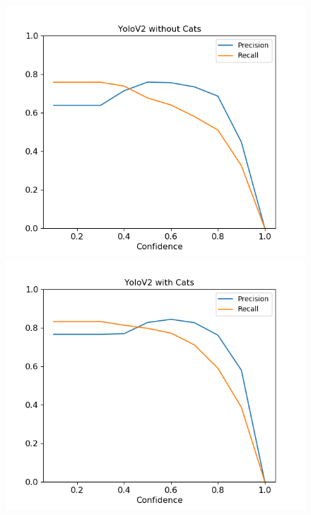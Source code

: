\documentclass{article}
\begin{document}
\begin{figure}
	\centering
	\begin{minipage}{0.4\textwidth}
		\includegraphics[width=\textwidth]{fig/pr_v2}
	\end{minipage}
	\begin{minipage}{0.4\textwidth}
		\includegraphics[width=\textwidth]{fig/pr_v2_cats}
	\end{minipage}
	\begin{minipage}{0.4\textwidth}

\end{minipage}
\end{figure}
\end{document}
